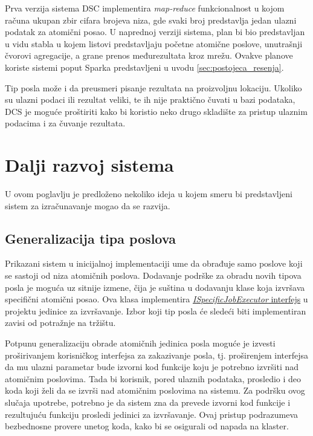\documentclass[12pt,oneside]{memoir}
\begin{document}
Prva verzija sistema DSC implementira \emph{map-reduce} funkcionalnost u kojom računa ukupan zbir cifara brojeva niza, gde svaki broj predstavlja jedan ulazni podatak za atomični posao. U naprednoj verziji sistema, plan bi bio predstavljan u vidu stabla u kojem listovi predstavljaju početne atomične poslove, unutrašnji čvorovi agregacije, a grane prenos međurezultata kroz mrežu. Ovakve planove koriste sistemi poput Sparka \cite{Spark} predstavljeni u uvodu \ref{sec:postojeca_resenja}.

Tip posla može i da preusmeri pisanje rezultata na proizvoljnu lokaciju.
Ukoliko su ulazni podaci ili rezultat veliki, te ih nije praktično čuvati u bazi podataka, DCS je moguće proštiriti kako bi koristio neko drugo skladište za pristup ulaznim podacima i za čuvanje rezultata.

\section{Dalji razvoj sistema}
U ovom poglavlju je predloženo nekoliko ideja u kojem smeru bi predstavljeni sistem za izračunavanje mogao da se razvija.

\subsection{Generalizacija tipa poslova}

Prikazani sistem u inicijalnoj implementaciji ume da obrađuje samo poslove koji se sastoji od niza atomičnih poslova. Dodavanje podrške za obradu novih tipova posla je moguća uz sitnije izmene, čija je suština u dodavanju klase koja izvršava specifični atomični posao. Ova klasa implementira \href{https://github.com/milana-kovacevic/DistributedComputationSystem/blob/main/src/ComputeNode/Executors/ISpecificJobExecutor.cs}{\emph{ISpecificJobExecutor} interfejs} u projektu jedinice za izvršavanje. Izbor koji tip posla će sledeći biti implementiran zavisi od potražnje na tržištu.

Potpunu generalizaciju obrade atomičnih jedinica posla moguće je izvesti proširivanjem korisničkog interfejsa za zakazivanje posla, tj. proširenjem interfejsa da mu ulazni parametar bude izvorni kod funkcije koju je potrebno izvršiti nad atomičnim poslovima. Tada bi korisnik, pored ulaznih podataka, prosledio i deo koda koji želi da se izvrši nad atomičnim poslovima na sistemu. Za podršku ovog slučaja upotrebe, potrebno je da sistem zna da prevede izvorni kod funkcije i rezultujuću funkciju prosledi jedinici za izvršavanje. Ovaj pristup podrazumeva bezbednosne provere unetog koda, kako bi se osigurali od napada na klaster.
\end{document}
